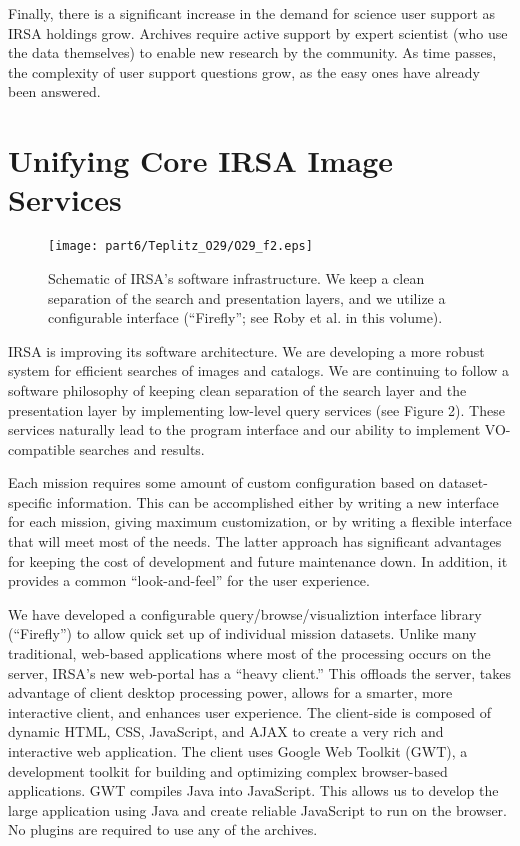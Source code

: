 Finally, there is a significant increase in the demand for
science user support as IRSA holdings grow.  Archives require active
support by expert scientist (who use the data themselves) to enable
new research by the community.  As time passes, the complexity of user
support questions grow, as the easy ones have already been answered.


\section{Unifying Core IRSA Image Services}

\begin{figure}[t]

\centering
\texttt{[image: part6/Teplitz\_O29/O29\_f2.eps]}
\caption{Schematic of IRSA's software infrastructure. We keep a clean 
separation of the search and presentation layers, and we utilize a
configurable interface (``Firefly''; see Roby et al. in this volume).}

\end{figure}

IRSA is improving its software architecture. We are developing a more
robust system for efficient searches of images and catalogs. We are
continuing to follow a software philosophy of keeping clean separation
of the search layer and the presentation layer by implementing
low-level query services (see Figure 2). These services naturally lead to the program
interface and our ability to implement VO-compatible
searches and results.

Each mission requires some amount of custom configuration
based on dataset-specific information.  This can be accomplished
either by writing a new interface for each mission, giving maximum
customization, or by writing a flexible interface that will meet most
of the needs.  The latter approach has significant advantages for
keeping the cost of development and future maintenance down.  In
addition, it provides a common ``look-and-feel'' for the user experience.

We have developed a configurable query/browse/visualiztion interface
library (``Firefly'') to allow quick set up of individual mission
datasets.  Unlike many traditional, web-based applications where most
of the processing occurs on the server, IRSA’s new web-portal has a
“heavy client.” This offloads the server, takes advantage of client
desktop processing power, allows for a smarter, more interactive
client, and enhances user experience. The client-side is composed of
dynamic HTML, CSS, JavaScript, and AJAX to create a very rich and
interactive web application. The client uses Google Web Toolkit (GWT),
a development toolkit for building and optimizing complex
browser-based applications. GWT compiles Java into JavaScript. This
allows us to develop the large application using Java and create
reliable JavaScript to run on the browser. No plugins are required to
use any of the archives.  

